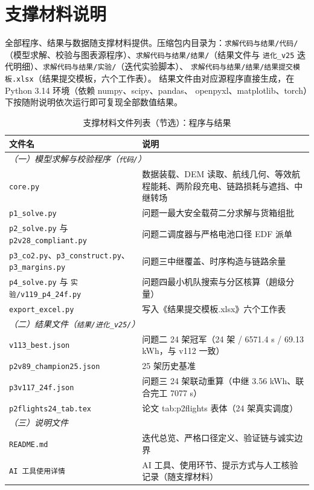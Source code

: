 \section{支撑材料说明}

全部程序、结果与数据随支撑材料提供。压缩包内目录为：\texttt{求解代码与结果/代码/}
（模型求解、校验与图表源程序）、\texttt{求解代码与结果/结果/}（结果文件与
\texttt{进化\_v25} 迭代明细）、\texttt{求解代码与结果/实验/}（迭代实验脚本）、
\texttt{求解代码与结果/结果/结果提交模板.xlsx}（结果提交模板，六个工作表）。
结果文件由对应源程序直接生成，在 Python 3.14 环境（依赖 numpy、scipy、pandas、
openpyxl、matplotlib、torch）下按随附说明依次运行即可复现全部数值结果。

\begin{table}[!htbp]
\caption{支撑材料文件列表（节选）：程序与结果}\label{tab:support}
\centering
\small
\begin{tabular}{ll}
\toprule
文件名 & 说明 \\
\midrule
\multicolumn{2}{l}{\textit{（一）模型求解与校验程序（\texttt{代码/}）}} \\
\texttt{core.py} & 数据装载、DEM 读取、航线几何、等效航程能耗、两阶段充电、链路损耗与遮挡、中继转场 \\
\texttt{p1\_solve.py} & 问题一最大安全载荷二分求解与货箱组批 \\
\texttt{p2\_solve.py} 与 \texttt{p2v28\_compliant.py} & 问题二调度器与严格电池口径 EDF 派单 \\
\texttt{p3\_co2.py}、\texttt{p3\_construct.py}、\texttt{p3\_margins.py} & 问题三中继覆盖、时序构造与链路余量 \\
\texttt{p4\_solve.py} 与 \texttt{实验/v119\_p4\_24f.py} & 问题四最小机队搜索与分区核算（趟级分量） \\
\texttt{export\_excel.py} & 写入《结果提交模板.xlsx》六个工作表 \\
\midrule
\multicolumn{2}{l}{\textit{（二）结果文件（\texttt{结果/进化\_v25/}）}} \\
\texttt{v113\_best.json} & 问题二 24 架冠军（24 架 / 6571.4 s / 69.13 kWh，与 v112 一致） \\
\texttt{p2v89\_champion25.json} & 25 架历史基准 \\
\texttt{p3v117\_24f.json} & 问题三 24 架联动重算（中继 3.56 kWh、联合完工 7077 s） \\
\texttt{p2flights24\_tab.tex} & 论文 tab:p2flights 表体（24 架真实调度） \\
\midrule
\multicolumn{2}{l}{\textit{（三）说明文件}} \\
\texttt{README.md} & 迭代总览、严格口径定义、验证链与诚实边界 \\
\texttt{AI 工具使用详情} & AI 工具、使用环节、提示方式与人工核验记录（随支撑材料） \\
\bottomrule
\end{tabular}
\end{table}

